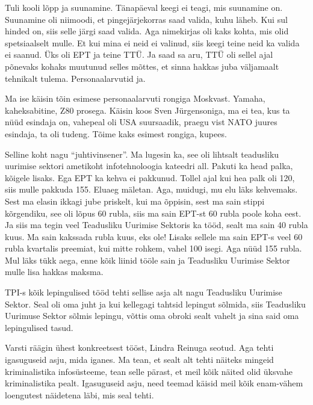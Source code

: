 
Tuli kooli lõpp ja suunamine. Tänapäeval keegi ei teagi, mis suunamine on. 
Suunamine oli niimoodi, et pingejärjekorras saad valida, kuhu läheb. Kui sul 
hinded on, siis selle järgi saad valida. Aga  nimekirjas oli kaks kohta, mis 
olid spetsiaalselt mulle. Et kui mina ei neid ei valinud, siis keegi teine neid 
ka valida ei saanud. Üks oli EPT ja teine TTÜ. Ja saad sa aru, TTÜ oli sellel 
ajal põnevaks kohaks muutunud selles mõttes, et sinna hakkas juba väljamaalt 
tehnikalt tulema. Personaalarvutid ja. 

Ma ise käisin tõin esimese personaalarvuti rongiga Moskvast. Yamaha, 
kaheksabitine, Z80 prosega. Käisin koos  Sven 
Jürgensoniga, ma ei tea, kus ta nüüd esindaja on, 
vahepeal oli USA suursaadik, praegu vist NATO juures esindaja, ta oli tudeng. 
Tõime kaks esimest rongiga,  kupees. 


Selline koht nagu \enquote{juhtivinsener}. Ma lugesin ka, see oli lihtsalt 
teadusliku uurimise sektori ametikoht infotehnoloogia kateedri 
all. Pakuti ka head 
palka, kõigele lisaks. Ega EPT ka kehva ei pakkunud. Tollel ajal kui hea palk 
oli 120, siis mulle pakkuda 155. Eluaeg mäletan. Aga,  muidugi, mu elu läks 
kehvemaks. Sest ma elasin ikkagi jube priskelt, kui ma õppisin, sest ma sain 
stippi kõrgendiku, see oli lõpus 60 rubla, siis ma sain EPT-st 60 rubla poole 
koha eest. Ja siis ma tegin veel Teadusliku Uurimise Sektoris ka tööd, sealt ma sain 40 rubla 
kuus. Ma sain kakssada rubla kuus, eks ole! Lisaks sellele ma sain EPT-s veel 
60 rubla kvartalis preemiat, kui mitte rohkem, vahel 100 isegi. Aga nüüd 155 
rubla. Mul läks tükk aega, enne kõik liinid tööle sain ja Teadusliku Uurimise 
Sektor mulle lisa hakkas maksma. 


TPI-s kõik lepingulised tööd tehti sellise asja alt nagu Teadusliku Uurimise 
Sektor. Seal oli oma juht ja kui kellegagi tahtsid lepingut sõlmida, siis 
Teadusliku Uurimuse Sektor sõlmis lepingu, võttis oma obroki sealt vahelt ja 
sina said oma lepingulised tasud. 


Varsti räägin ühest konkreetsest tööst, Lindra Reinuga 
seotud. Aga tehti igasuguseid asju, mida iganes. Ma tean, et sealt alt tehti 
näiteks mingeid kriminalistika infosüsteeme, tean selle pärast, et meil kõik 
näited olid üksvahe kriminalistika pealt. Igasuguseid asju, need teemad käisid 
meil kõik enam-vähem loengutest näidetena läbi, mis seal tehti. 

